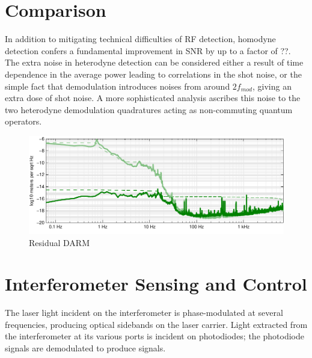 \section{Comparison}

In addition to mitigating technical difficulties of RF detection,
homodyne detection confers a fundamental improvement in SNR by up to a
factor of ??. The extra noise in heterodyne detection can be
considered either a result of time dependence in the average power
leading to correlations in the shot
noise\cite{Niebauer1991Nonstationary}, or the simple fact that
demodulation introduces noises from around $2f_{mod}$, giving
an extra dose of shot noise.  A more sophisticated analysis ascribes
this noise to the two heterodyne demodulation quadratures acting as
non-commuting quantum operators\cite{Buonanno2003Quantum}.

\begin{figure}
\centerline{\includegraphics[width=\columnwidth]{figures/residualDARM.pdf}}
\caption[Residual DARM motion]{\label{fig:residual-DARM}Residual DARM}
\end{figure}

\section{Interferometer Sensing and Control}

The laser light incident on the interferometer is phase-modulated at
several frequencies, producing optical sidebands on the laser carrier.
Light extracted from the interferometer at its various ports is
incident on photodiodes; the photodiode signals are demodulated to
produce signals.

